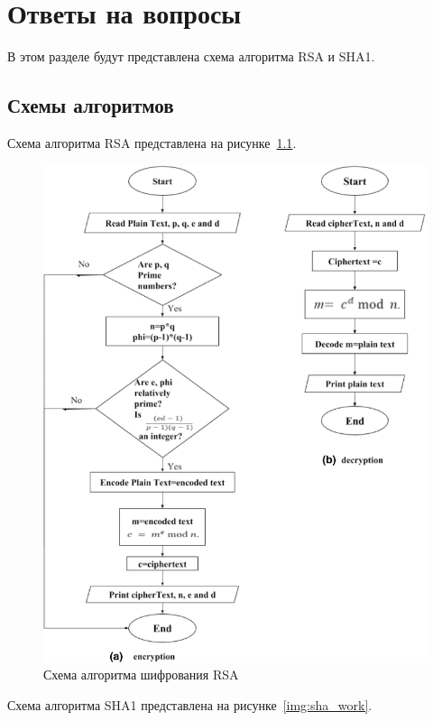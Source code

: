 \chapter{Ответы на вопросы}

В этом разделе будут представлена схема алгоритма RSA и SHA1.

\section{Схемы алгоритмов}

Схема алгоритма RSA представлена на рисунке~\ref{img:rsa_work}.

\begin{figure}[ht!]
	\centering
	\includegraphics[width=0.8\linewidth]{images/rsa_work.png}
	\caption{Схема алгоритма шифрования RSA}
	\label{img:rsa_work}
\end{figure}

Схема алгоритма SHA1 представлена на рисунке~\ref{img:sha_work}.

